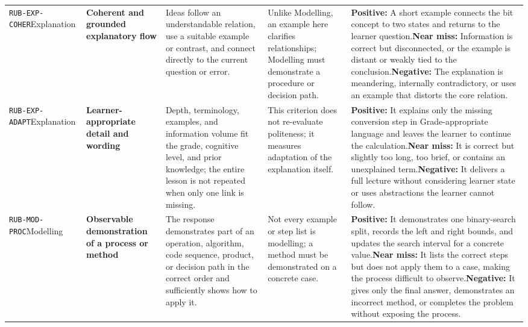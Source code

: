 \documentclass[conference]{IEEEtran}
\begin{document}
\begin{longtable}{P{0.14\textwidth}P{0.17\textwidth}P{0.20\textwidth}P{0.17\textwidth}P{0.24\textwidth}}
\texttt{RUB-EXP-COHER}\newline{}Explanation & \textbf{Coherent and grounded explanatory flow} & Ideas follow an understandable relation, use a suitable example or contrast, and connect directly to the current question or error. & Unlike Modelling, an example here clarifies relationships; Modelling must demonstrate a procedure or decision path. & \textbf{Positive:} A short example connects the bit concept to two states and returns to the learner question.\newline\textbf{Near miss:} Information is correct but disconnected, or the example is distant or weakly tied to the conclusion.\newline\textbf{Negative:} The explanation is meandering, internally contradictory, or uses an example that distorts the core relation. \\
\texttt{RUB-EXP-ADAPT}\newline{}Explanation & \textbf{Learner-appropriate detail and wording} & Depth, terminology, examples, and information volume fit the grade, cognitive level, and prior knowledge; the entire lesson is not repeated when only one link is missing. & This criterion does not re-evaluate politeness; it measures adaptation of the explanation itself. & \textbf{Positive:} It explains only the missing conversion step in Grade-appropriate language and leaves the learner to continue the calculation.\newline\textbf{Near miss:} It is correct but slightly too long, too brief, or contains an unexplained term.\newline\textbf{Negative:} It delivers a full lecture without considering learner state or uses abstractions the learner cannot follow. \\
\texttt{RUB-MOD-PROC}\newline{}Modelling & \textbf{Observable demonstration of a process or method} & The response demonstrates part of an operation, algorithm, code sequence, product, or decision path in the correct order and sufficiently shows how to apply it. & Not every example or step list is modelling; a method must be demonstrated on a concrete case. & \textbf{Positive:} It demonstrates one binary-search split, records the left and right bounds, and updates the search interval for a concrete value.\newline\textbf{Near miss:} It lists the correct steps but does not apply them to a case, making the process difficult to observe.\newline\textbf{Negative:} It gives only the final answer, demonstrates an incorrect method, or completes the problem without exposing the process. \\

\end{longtable}
\end{document}
